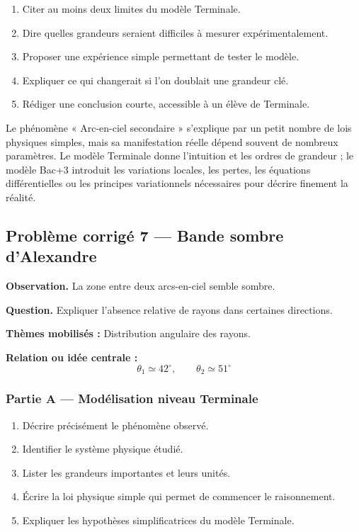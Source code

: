\documentclass[11pt,a4paper]{article}
\begin{document}
\begin{enumerate}
  \item Citer au moins deux limites du modèle Terminale.
  \item Dire quelles grandeurs seraient difficiles à mesurer expérimentalement.
  \item Proposer une expérience simple permettant de tester le modèle.
  \item Expliquer ce qui changerait si l'on doublait une grandeur clé.
  \item Rédiger une conclusion courte, accessible à un élève de Terminale.
\end{enumerate}

\begin{corrigebox}
Le phénomène « Arc-en-ciel secondaire » s'explique par un petit nombre de lois physiques simples, mais sa manifestation réelle dépend souvent de nombreux paramètres. Le modèle Terminale donne l'intuition et les ordres de grandeur ; le modèle Bac+3 introduit les variations locales, les pertes, les équations différentielles ou les principes variationnels nécessaires pour décrire finement la réalité.
\end{corrigebox}

\subsection{Problème corrigé 7 — Bande sombre d'Alexandre}

\begin{exercicebox}
\textbf{Observation.} La zone entre deux arcs-en-ciel semble sombre.

\medskip
\textbf{Question.} Expliquer l'absence relative de rayons dans certaines directions.

\medskip
\textbf{Thèmes mobilisés :} Distribution angulaire des rayons.

\medskip
\textbf{Relation ou idée centrale :}
\[
\theta_1\simeq42^\circ,\qquad \theta_2\simeq51^\circ
\]
\end{exercicebox}

\subsubsection*{Partie A — Modélisation niveau Terminale}

\begin{enumerate}
  \item Décrire précisément le phénomène observé.
  \item Identifier le système physique étudié.
  \item Lister les grandeurs importantes et leurs unités.
  \item Écrire la loi physique simple qui permet de commencer le raisonnement.
  \item Expliquer les hypothèses simplificatrices du modèle Terminale.
\end{enumerate}
\end{document}
